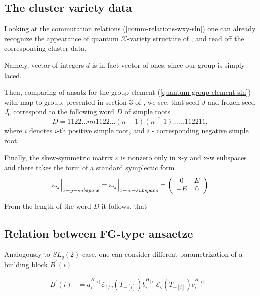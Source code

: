 \documentclass{article}
\newcommand{\lb}{\left (}
\newcommand{\rb}{\right )}
\newcommand{\lsb}{\left [}
\newcommand{\rsb}{\right ]}
\newcommand{\SB}[1]{\lsb #1 \rsb}
\newcommand{\ve}{\varepsilon}
\newcommand {\?}{\textit{???}}
\newcommand{\me}[0]{\mathcal{E}}
\newcommand{\Bp}[1]{B^{'}\lb #1 \rb}
\newcommand{\Tp}[1][]{T_{+ #1}}
\newcommand{\Tm}[1][]{T_{- #1}}
\newcommand{\delabel}[1]{(\ref{#1})}
\begin{document}
\subsection{The cluster variety data}

Looking at the commutation relations \delabel{comm-relations-wxy-sln} one can already
recognize the appearance of quantum $\mathcal{X}$-variety structure of \cite{FG1},
and read off the corresponsing cluster data.

Namely, vector of integers $d$ is in fact vector of ones, since our group is simply laced.

Then, comparing of ansatz for the group element \delabel{quantum-group-element-sln}
with map to group, presented in section 3 of \cite{FG2}, we see, that
seed $J$ and frozen seed $J_0$ correspond to the following word $D$ of simple roots
\begin{equation}
D = 1 \overline{1} 2 \overline{2} \dots n \overline{n} 1 \overline{1} 2 \overline{2} \dots (n - 1)\overline{(n-1)}
\dots \dots 1 \overline{1} 2 \overline{2} 1 \overline{1},
\end{equation}
where $i$ denotes $i$-th positive simple root, and $\overline{i}$ - corresponding negative simple root.

Finally, the skew-symmetric matrix $\ve$ is nonzero only in x-y and x-w subspaces and
there takes the form of a standard symplectic form
\begin{equation}
  \ve_{ij} \Big{|}_{x-y-subspace} = \ve_{ij} \Big{|}_{x-w-subspace} = \lb \begin{array}{cc} 0 & E \\ -E & 0 \end{array} \rb
\end{equation}

From the length of the word $D$ it follows, that 

\subsection{Relation between FG-type ansaetze}

Analogously to $SL_q(2)$ case, one can consider different parametrization
of a building block $\Bp{i}$

\begin{align}
\label{building-block-alt-sln-fg}
\Bp{i} & = a_i^{H_{\SB{i}}} \me_{1/q} \lb \Tm[\SB{i}] \rb b_i^{H_{\SB{i}}} \me_{q} \lb \Tp[\SB{i}] \rb c_i^{H_{\SB{i}}} &
\end{align}
\end{document}
